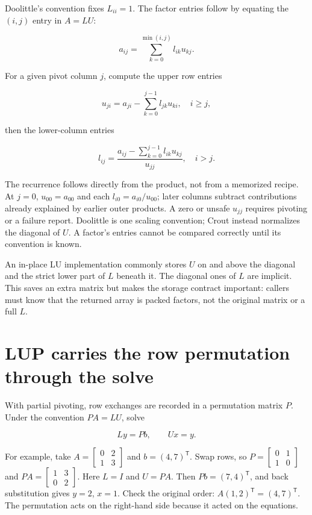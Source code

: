 Doolittle's convention fixes \(L_{ii}=1\). The factor entries follow by equating the \((i,j)\) entry in \(A=LU\):

\[
a_{ij}=\sum_{k=0}^{\min(i,j)} l_{ik}u_{kj}.
\]

For a given pivot column \(j\), compute the upper row entries

\[
u_{ji}=a_{ji}-\sum_{k=0}^{j-1}l_{jk}u_{ki},\quad i\ge j,
\]

then the lower-column entries

\[
l_{ij}=\frac{a_{ij}-\sum_{k=0}^{j-1}l_{ik}u_{kj}}{u_{jj}},\quad i>j.
\]

The recurrence follows directly from the product, not from a memorized recipe. At \(j=0\), \(u_{00}=a_{00}\) and each \(l_{i0}=a_{i0}/u_{00}\); later columns subtract contributions already explained by earlier outer products. A zero or unsafe \(u_{jj}\) requires pivoting or a failure report. Doolittle is one scaling convention; Crout instead normalizes the diagonal of \(U\). A factor's entries cannot be compared correctly until its convention is known.

An in-place LU implementation commonly stores \(U\) on and above the diagonal and the strict lower part of \(L\) beneath it. The diagonal ones of \(L\) are implicit. This saves an extra matrix but makes the storage contract important: callers must know that the returned array is packed factors, not the original matrix or a full \(L\).

\section{LUP carries the row permutation through the solve}\label{01-foundations-i-ch019-lup-carries-the-row-permutation-through-the-solve}

With partial pivoting, row exchanges are recorded in a permutation matrix \(P\). Under the convention \(PA=LU\), solve

\[
Ly=Pb,\qquad Ux=y.
\]

For example, take \(A=\begin{bmatrix}0&2\\1&3\end{bmatrix}\) and \(b=(4,7)^\mathsf T\). Swap rows, so \(P=\begin{bmatrix}0&1\\1&0\end{bmatrix}\) and \(PA=\begin{bmatrix}1&3\\0&2\end{bmatrix}\). Here \(L=I\) and \(U=PA\). Then \(Pb=(7,4)^\mathsf T\), and back substitution gives \(y=2\), \(x=1\). Check the original order: \(A(1,2)^\mathsf T=(4,7)^\mathsf T\). The permutation acts on the right-hand side because it acted on the equations.

